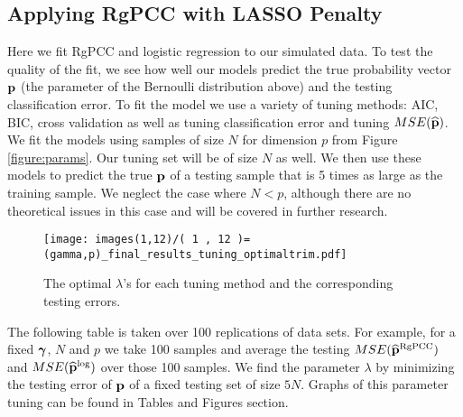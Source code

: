 \documentclass[main.tex]{subfiles}
\begin{document}
\subsection{Applying RgPCC with LASSO Penalty}
Here we fit RgPCC and logistic regression to our simulated data. To test the quality of the fit, we see how well our models predict the true probability vector $\mathbf{p}$ (the parameter of the Bernoulli distribution above) and the testing classification error. To fit the model we use a variety of tuning methods: AIC, BIC, cross validation as well as tuning classification error and tuning $MSE(\widehat{\mathbf{p}})$. We fit the models using samples of size $N$ for dimension $p$ from Figure \ref{figure:params}. Our tuning set will be of size $N$ as well. We then use these models to predict the true $\mathbf{p}$ of a testing sample that is 5 times as large as the training sample. We neglect the case where $N < p$, although there are no theoretical issues in this case and will be covered in further research.

\begin{figure}[H]
    \centering
    \texttt{[image: images(1,12)/( 1 , 12 )=(gamma,p)\_final\_results\_tuning\_optimaltrim.pdf]}
    \caption{The optimal $\lambda$'s for each tuning method and the corresponding testing errors.}
    \label{fig:1,12tuning_optimaltrim}
\end{figure}


The following table is taken over 100 replications of data sets. For example, for a fixed $\boldsymbol \gamma$, $N$ and $p$ we take 100 samples and average the testing $MSE(\widehat{\mathbf{p}}^{\text{RgPCC}})$ and $MSE(\widehat{\mathbf{p}}^{\log})$ over those 100 samples. We find the parameter $\lambda$ by minimizing the testing error of $\mathbf{p}$ of a fixed testing set of size $5N$. Graphs of this parameter tuning can be found in Tables and Figures section.



\end{document}
